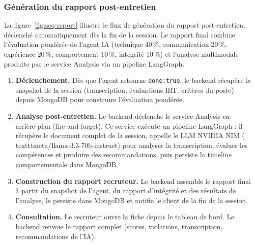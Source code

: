 \subsubsection{Génération du rapport post-entretien}

La figure~\ref{fig:seq-report} illustre le flux de génération du rapport post-entretien,
déclenché automatiquement dès la fin de la session. Le rapport final combine l'évaluation
pondérée de l'agent IA (technique 40\,\%, communication 20\,\%, expérience 20\,\%,
comportement 10\,\%, intégrité 10\,\%) et l'analyse multimodale produite par le service
Analysis via un pipeline LangGraph.

\begin{sloppypar}
\begin{enumerate}
  \item \textbf{Déclenchement.} Dès que l'agent retourne \texttt{done:true}, le backend
        récupère le snapshot de la session (transcription, évaluations IRT, critères du
        poste) depuis MongoDB pour construire l'évaluation pondérée.

  \item \textbf{Analyse post-entretien.} Le backend déclenche le service Analysis en
        arrière-plan (fire-and-forget). Ce service exécute un pipeline LangGraph : il
        récupère le document complet de la session, appelle le LLM NVIDIA NIM (\\texttt{meta/llama-3.3-70b-instruct}) pour analyser
        la transcription, évaluer les compétences et produire des recommandations, puis
        persiste la timeline comportementale dans MongoDB.

  \item \textbf{Construction du rapport recruteur.} Le backend assemble le rapport final
        à partir du snapshot de l'agent, du rapport d'intégrité et des résultats de
        l'analyse, le persiste dans MongoDB et notifie le client de la fin de la session.

  \item \textbf{Consultation.} Le recruteur ouvre la fiche depuis le tableau de bord. Le
        backend renvoie le rapport complet (scores, violations, transcription,
        recommandations de l'IA).
\end{enumerate}
\end{sloppypar}

